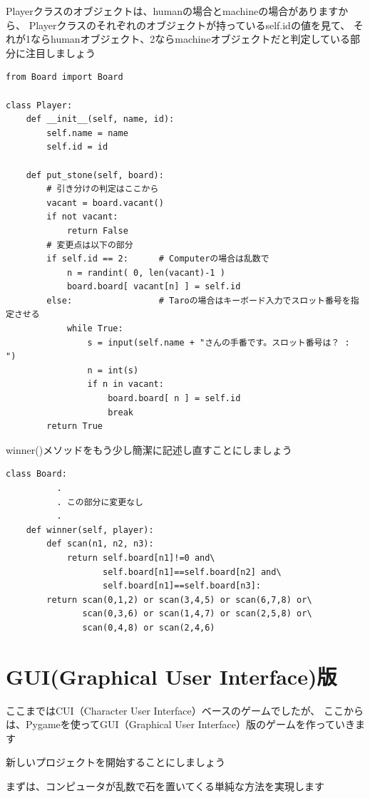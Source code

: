 \documentclass[uplatex,a4paper,11pt,oneside,openany]{jsbook}
\begin{document}
Playerクラスのオブジェクトは、humanの場合とmachineの場合がありますから、
Playerクラスのそれぞれのオブジェクトが持っているself.idの値を見て、
それが1ならhumanオブジェクト、2ならmachineオブジェクトだと判定している部分に注目しましょう

\begin{lstlisting}[caption=class Player,label=prog04-2]
from Board import Board

class Player:
    def __init__(self, name, id):
        self.name = name
        self.id = id

    def put_stone(self, board):
        # 引き分けの判定はここから
        vacant = board.vacant()
        if not vacant:
            return False
        # 変更点は以下の部分
        if self.id == 2:      # Computerの場合は乱数で
            n = randint( 0, len(vacant)-1 )
            board.board[ vacant[n] ] = self.id
        else:                 # Taroの場合はキーボード入力でスロット番号を指定させる
            while True:
                s = input(self.name + "さんの手番です。スロット番号は？ : ")
                n = int(s)
                if n in vacant:
                    board.board[ n ] = self.id
                    break
        return True
\end{lstlisting}%

winner()メソッドをもう少し簡潔に記述し直すことにしましょう

\begin{lstlisting}[caption=class Board,label=prog04-3]
class Board:
          .
          . この部分に変更なし
          .
    def winner(self, player):
        def scan(n1, n2, n3):
            return self.board[n1]!=0 and\
                   self.board[n1]==self.board[n2] and\
                   self.board[n1]==self.board[n3]:
        return scan(0,1,2) or scan(3,4,5) or scan(6,7,8) or\
               scan(0,3,6) or scan(1,4,7) or scan(2,5,8) or\
               scan(0,4,8) or scan(2,4,6)
\end{lstlisting}%

\section{GUI(Graphical User Interface)版}

ここまではCUI（Character User Interface）ベースのゲームでしたが、
ここからは、Pygameを使ってGUI（Graphical User Interface）版のゲームを作っていきます

新しいプロジェクトを開始することにしましょう

まずは、コンピュータが乱数で石を置いてくる単純な方法を実現します
\end{document}
